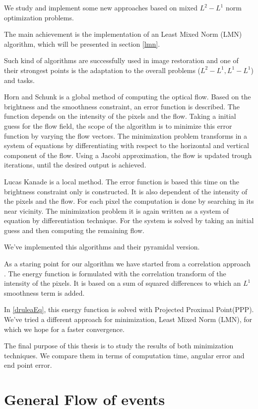 \documentclass[12pt,a4paper,twoside]{report}
\begin{document}
We study and implement some new approaches based on mixed $L^2-L^1$ norm optimization problems. 

The main achievement is the implementation of an Least Mixed Norm (LMN) algorithm, which will be presented in section \ref{lmn}.

Such kind of algorithms are successfully used in image restoration and one of their strongest points is the adaptation to the overall problems ($L^2-L^1, L^1-L^1$) and tasks.

Horn and Schunk is a global method of computing the optical flow. Based on the brightness and the smoothness constraint, an error function is described. The function depends on the intensity of the pixels and the flow. Taking a initial guess for the flow field, the scope of the algorithm is to minimize this error function by varying the flow vectors. The minimization problem transforms in a system of equations by differentiating with respect to the horizontal and vertical component of the flow. Using a Jacobi approximation, the flow is updated trough iterations, until the desired output is achieved.

Lucas Kanade is a local method. The error function is based this time on the brightness constraint only is constructed. It is also dependent of the intensity of the pixels and the flow. For each pixel the computation is done by searching in its near vicinity. The minimization problem it is again written as a system of equation by differentiation technique. For the system is solved by taking an initial guess and then computing the remaining flow.

We've implemented this algorithms and their pyramidal version.

As a staring point for our algorithm we have started from a correlation approach \cite{drulea2013}. The energy function is formulated with the correlation transform of the intensity of the pixels. It is based on a sum of squared differences to which an $L^1$ smoothness term is added. 

In \ref{druleaEq}, this energy function is solved with Projected Proximal Point(PPP). We've tried a different approach for minimization, Least Mixed Norm (LMN), for which we hope for a faster convergence. 

The final purpose of this thesis is to study the results of both minimization techniques. We compare them in terms of computation time, angular error and end point error.   

\section{General Flow of events}
\end{document}
